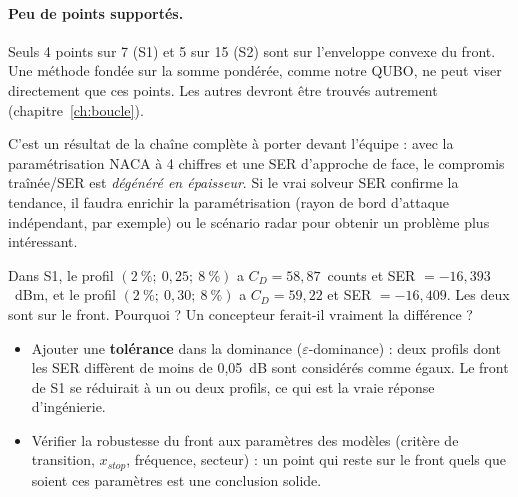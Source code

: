 \paragraph{Peu de points supportés.} Seuls 4 points sur 7 (S1) et 5 sur 15 (S2) sont sur l'enveloppe convexe du front. Une méthode fondée sur la somme pondérée, comme notre QUBO, ne peut viser directement que ces points. Les autres devront être trouvés autrement (chapitre~\ref{ch:boucle}).

\begin{projet}
C'est un résultat de la chaîne complète à porter devant l'équipe : avec la paramétrisation NACA à 4 chiffres et une SER d'approche de face, le compromis traînée/SER est \emph{dégénéré en épaisseur}. Si le vrai solveur SER confirme la tendance, il faudra enrichir la paramétrisation (rayon de bord d'attaque indépendant, par exemple) ou le scénario radar pour obtenir un problème plus intéressant.
\end{projet}

\exercices
\begin{exercice}
Dans S1, le profil $(2~\%;\ 0{,}25;\ 8~\%)$ a $C_D=58{,}87$~counts et SER $=-16{,}393$~dBm, et le profil $(2~\%;\ 0{,}30;\ 8~\%)$ a $C_D=59{,}22$ et SER $=-16{,}409$. Les deux sont sur le front. Pourquoi ? Un concepteur ferait-il vraiment la différence ?
\end{exercice}

\begin{pistes}
\begin{itemize}
\item Ajouter une \textbf{tolérance} dans la dominance ($\varepsilon$-dominance) : deux profils dont les SER diffèrent de moins de 0,05~dB sont considérés comme égaux. Le front de S1 se réduirait à un ou deux profils, ce qui est la vraie réponse d'ingénierie.
\item Vérifier la robustesse du front aux paramètres des modèles (critère de transition, $x_{stop}$, fréquence, secteur) : un point qui reste sur le front quels que soient ces paramètres est une conclusion solide.
\end{itemize}
\end{pistes}
